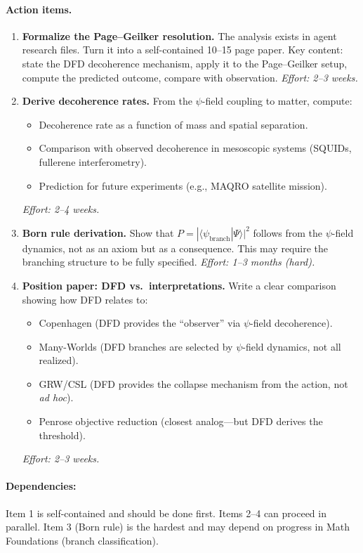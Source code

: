 \documentclass[11pt,a4paper]{article}
\begin{document}
\paragraph{Action items.}
\begin{enumerate}
    \item \textbf{Formalize the Page--Geilker resolution.} The analysis exists in agent research files. Turn it into a self-contained 10--15 page paper. Key content: state the DFD decoherence mechanism, apply it to the Page--Geilker setup, compute the predicted outcome, compare with observation. \emph{Effort: 2--3 weeks.}
    \item \textbf{Derive decoherence rates.} From the $\psi$-field coupling to matter, compute:
    \begin{itemize}
        \item Decoherence rate as a function of mass and spatial separation.
        \item Comparison with observed decoherence in mesoscopic systems (SQUIDs, fullerene interferometry).
        \item Prediction for future experiments (e.g., MAQRO satellite mission).
    \end{itemize}
    \emph{Effort: 2--4 weeks.}
    \item \textbf{Born rule derivation.} Show that $P = |\langle \psi_{\text{branch}} | \Psi \rangle|^2$ follows from the $\psi$-field dynamics, not as an axiom but as a consequence. This may require the branching structure to be fully specified. \emph{Effort: 1--3 months (hard).}
    \item \textbf{Position paper: DFD vs.\ interpretations.} Write a clear comparison showing how DFD relates to:
    \begin{itemize}
        \item Copenhagen (DFD provides the ``observer'' via $\psi$-field decoherence).
        \item Many-Worlds (DFD branches are selected by $\psi$-field dynamics, not all realized).
        \item GRW/CSL (DFD provides the collapse mechanism from the action, not \emph{ad hoc}).
        \item Penrose objective reduction (closest analog---but DFD derives the threshold).
    \end{itemize}
    \emph{Effort: 2--3 weeks.}
\end{enumerate}

\paragraph{Dependencies:} Item 1 is self-contained and should be done first. Items 2--4 can proceed in parallel. Item 3 (Born rule) is the hardest and may depend on progress in Math Foundations (branch classification).
\end{document}
